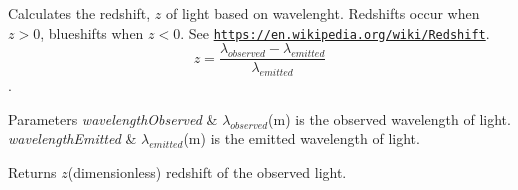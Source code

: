 Calculates the redshift, $z$ of light based on wavelenght. Redshifts occur when $z > 0$, blueshifts when $z < 0$. See \href{https://en.wikipedia.org/wiki/Redshift}{\tt https\+://en.\+wikipedia.\+org/wiki/\+Redshift}. \[z=\frac{\lambda_{observed}-\lambda_{emitted}}{\lambda_{emitted}}\]. 


\begin{DoxyParams}{Parameters}
{\em wavelength\+Observed} & $\lambda_{observed}$(m) is the observed wavelength of light. \\
\hline
{\em wavelength\+Emitted} & $\lambda_{emitted}$(m) is the emitted wavelength of light. \\
\hline
\end{DoxyParams}
\begin{DoxyReturn}{Returns}
$z$(dimensionless) redshift of the observed light. 
\end{DoxyReturn}
